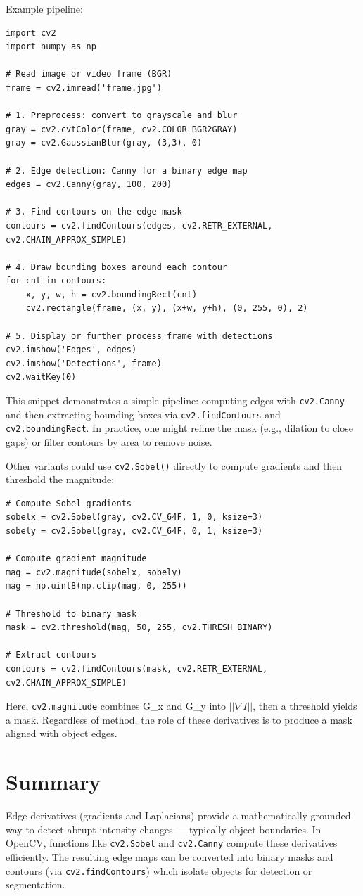 \documentclass[12pt]{article}
\begin{document}
Example pipeline:
\begin{verbatim}
import cv2
import numpy as np

# Read image or video frame (BGR)
frame = cv2.imread('frame.jpg')

# 1. Preprocess: convert to grayscale and blur
gray = cv2.cvtColor(frame, cv2.COLOR_BGR2GRAY)
gray = cv2.GaussianBlur(gray, (3,3), 0)

# 2. Edge detection: Canny for a binary edge map
edges = cv2.Canny(gray, 100, 200)

# 3. Find contours on the edge mask
contours = cv2.findContours(edges, cv2.RETR_EXTERNAL, cv2.CHAIN_APPROX_SIMPLE)

# 4. Draw bounding boxes around each contour
for cnt in contours:
    x, y, w, h = cv2.boundingRect(cnt)
    cv2.rectangle(frame, (x, y), (x+w, y+h), (0, 255, 0), 2)

# 5. Display or further process frame with detections
cv2.imshow('Edges', edges)
cv2.imshow('Detections', frame)
cv2.waitKey(0)
\end{verbatim}

This snippet demonstrates a simple pipeline: computing edges with \texttt{cv2.Canny} and then extracting bounding boxes via \texttt{cv2.findContours} and \texttt{cv2.boundingRect}. In practice, one might refine the mask (e.g., dilation to close gaps) or filter contours by area to remove noise.

Other variants could use \texttt{cv2.Sobel()} directly to compute gradients and then threshold the magnitude:

\begin{verbatim}
# Compute Sobel gradients
sobelx = cv2.Sobel(gray, cv2.CV_64F, 1, 0, ksize=3)
sobely = cv2.Sobel(gray, cv2.CV_64F, 0, 1, ksize=3)

# Compute gradient magnitude
mag = cv2.magnitude(sobelx, sobely)
mag = np.uint8(np.clip(mag, 0, 255))

# Threshold to binary mask
mask = cv2.threshold(mag, 50, 255, cv2.THRESH_BINARY)

# Extract contours
contours = cv2.findContours(mask, cv2.RETR_EXTERNAL, cv2.CHAIN_APPROX_SIMPLE)
\end{verbatim}

Here, \texttt{cv2.magnitude} combines G\_x and G\_y into $||\nabla I|| $, then a threshold yields a mask. Regardless of method, the role of these derivatives is to produce a mask aligned with object edges.


\section{Summary}
Edge derivatives (gradients and Laplacians) provide a mathematically grounded way to detect abrupt intensity changes --- typically object boundaries. In OpenCV, functions like \texttt{cv2.Sobel} and \texttt{cv2.Canny} compute these derivatives efficiently. The resulting edge maps can be converted into binary masks and contours (via \texttt{cv2.findContours}) which isolate objects for detection or segmentation.
\end{document}
